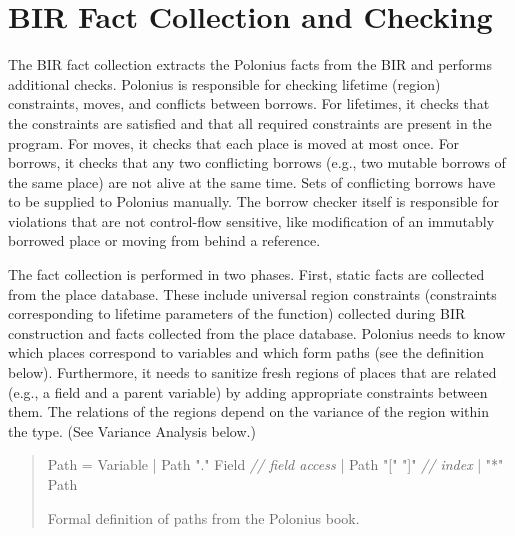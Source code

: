 \documentclass[
  11pt,
  twoside,symmetric]{report}
\newenvironment{Shaded}{}{}
\newcommand{\CommentTok}[1]{\textit{#1}}
\newcommand{\NormalTok}[1]{#1}
\newcommand{\OperatorTok}[1]{#1}
\newcommand{\StringTok}[1]{#1}
\begin{document}
\section{BIR Fact Collection and
Checking}\label{bir-fact-collection-and-checking}

The BIR fact collection extracts the Polonius facts from the BIR and
performs additional checks. Polonius is responsible for checking
lifetime (region) constraints, moves, and conflicts between borrows. For
lifetimes, it checks that the constraints are satisfied and that all
required constraints are present in the program. For moves, it checks
that each place is moved at most once. For borrows, it checks that any
two conflicting borrows (e.g., two mutable borrows of the same place)
are not alive at the same time. Sets of conflicting borrows have to be
supplied to Polonius manually. The borrow checker itself is responsible
for violations that are not control-flow sensitive, like modification of
an immutably borrowed place or moving from behind a reference.

The fact collection is performed in two phases. First, static facts are
collected from the place database. These include universal region
constraints (constraints corresponding to lifetime parameters of the
function) collected during BIR construction and facts collected from the
place database. Polonius needs to know which places correspond to
variables and which form paths (see the definition below). Furthermore,
it needs to sanitize fresh regions of places that are related (e.g., a
field and a parent variable) by adding appropriate constraints between
them. The relations of the regions depend on the variance of the region
within the type. (See Variance Analysis below.)

\begin{quote}
\begin{Shaded}
\begin{Highlighting}[]
\NormalTok{Path }\OperatorTok{=}\NormalTok{ Variable}
     \OperatorTok{|}\NormalTok{ Path }\StringTok{"."}\NormalTok{ Field }\CommentTok{// field access}
     \OperatorTok{|}\NormalTok{ Path }\StringTok{"["} \StringTok{"]"}   \CommentTok{// index}
     \OperatorTok{|} \StringTok{"*"}\NormalTok{ Path}
\end{Highlighting}
\end{Shaded}

Formal definition of paths from the Polonius
book.
\end{quote}
\end{document}
